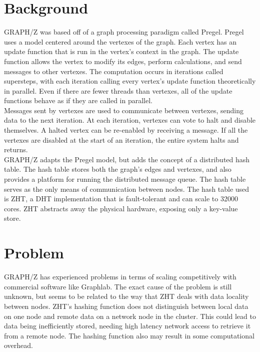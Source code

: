 \documentclass[10pt]{article}
\begin{document}
\begin{multicols}{2} 
  \section{Background} 
GRAPH/Z was based off of a graph processing paradigm called Pregel. Pregel uses a model centered around the vertexes of the graph. \cite{Gz:1}  Each vertex has an update function that is run in the vertex's context in the graph. The update function allows the vertex to modify its edges, perform calculations, and send messages to other vertexes. \cite{Gz:1} The computation occurs in iterations called supersteps, with each iteration calling every vertex's update function theoretically in parallel. Even if there are fewer threads than vertexes, all of the update functions behave as if they are called in parallel. \cite{Gz:1}\\
  Messages sent by vertexes are used to communicate between vertexes, sending data to the next iteration. At each iteration, vertexes can vote to halt and disable themselves. A halted vertex can be re-enabled by receiving a message. If all the vertexes are disabled at the start of an iteration, the entire system halts and returns.\\
  GRAPH/Z adapts the Pregel model, but adds the concept of a distributed hash table. The hash table stores both the graph's edges and vertexes, and also provides a platform for running the distributed message queue. The hash table serves as the only means of communication between nodes. The hash table used is ZHT, a DHT implementation that is fault-tolerant and can scale to 32000 cores. \cite{Gz:2} ZHT abstracts away the physical hardware, exposing only a key-value store. 
   
  \section{Problem}
  GRAPH/Z has experienced problems in terms of scaling competitively  with commercial software like Graphlab. The exact cause of the problem is still unknown, but seems to be related to the way that ZHT deals with data locality between nodes. ZHT's hashing function does not distinguish between local data on one node and remote data on a network node in the cluster. \cite{Gz:3} This could lead to data being inefficiently stored, needing high latency network access to retrieve it from a remote node. The hashing function also may result in some computational overhead. 


\end{multicols}
\end{document}
